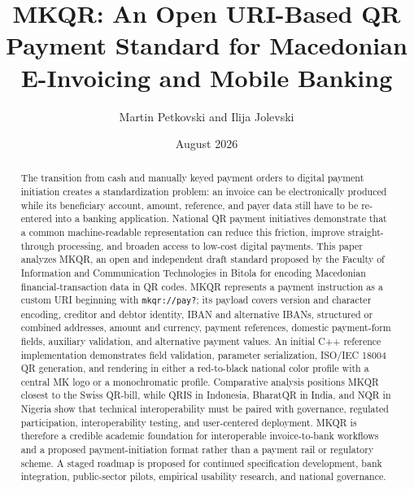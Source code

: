 \title{MKQR: An Open URI-Based QR Payment Standard for Macedonian E-Invoicing and Mobile Banking}
\author{Martin Petkovski and Ilija Jolevski}
\date{August 2026}


\maketitle

\begin{abstract}
The transition from cash and manually keyed payment orders to digital payment initiation creates a standardization problem: an invoice can be electronically produced while its beneficiary account, amount, reference, and payer data still have to be re-entered into a banking application. National QR payment initiatives demonstrate that a common machine-readable representation can reduce this friction, improve straight-through processing, and broaden access to low-cost digital payments. This paper analyzes MKQR, an open and independent draft standard proposed by the Faculty of Information and Communication Technologies in Bitola for encoding Macedonian financial-transaction data in QR codes. MKQR represents a payment instruction as a custom URI beginning with \texttt{mkqr://pay?}; its payload covers version and character encoding, creditor and debtor identity, IBAN and alternative IBANs, structured or combined addresses, amount and currency, payment references, domestic payment-form fields, auxiliary validation, and alternative payment values. An initial C++ reference implementation demonstrates field validation, parameter serialization, ISO/IEC 18004 QR generation, and rendering in either a red-to-black national color profile with a central MK logo or a monochromatic profile. Comparative analysis positions MKQR closest to the Swiss QR-bill, while QRIS in Indonesia, BharatQR in India, and NQR in Nigeria show that technical interoperability must be paired with governance, regulated participation, interoperability testing, and user-centered deployment. MKQR is therefore a credible academic foundation for interoperable invoice-to-bank workflows and a proposed payment-initiation format rather than a payment rail or regulatory scheme. A staged roadmap is proposed for continued specification development, bank integration, public-sector pilots, empirical usability research, and national governance.
\end{abstract}

